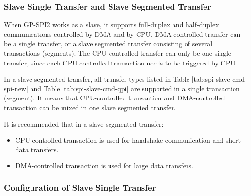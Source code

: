 \documentclass[main\_\_EN.tex]{subfiles}
\begin{document}
\subsubsection{Slave Single Transfer and Slave Segmented Transfer}\label{sec:gp-spi2-slave-seg-trans}

When GP-SPI2 works as a slave, it supports full-duplex and half-duplex communications controlled by DMA and by CPU. DMA-controlled transfer can be a single transfer, or a slave segmented transfer consisting of several transactions (segments). The CPU-controlled transfer can only be one single transfer, since each CPU-controlled transaction needs to be triggered by CPU.

In a slave segmented transfer, all transfer types listed in Table \ref{tab:spi-slave-cmd-spi-new} and Table \ref{tab:spi-slave-cmd-qpi} are supported in a single transaction (segment). It means that CPU-controlled transaction and DMA-controlled transaction can be mixed in one slave segmented transfer.

It is recommended that in a slave segmented transfer:

\begin{itemize}
    \item CPU-controlled transaction is used for handshake communication and short data transfers.

    \item  DMA-controlled transaction is used for large data transfers.
\end{itemize}

\subsubsection{Configuration of Slave Single Transfer}\label{GP-SPI2 slave single transfer}
\end{document}
